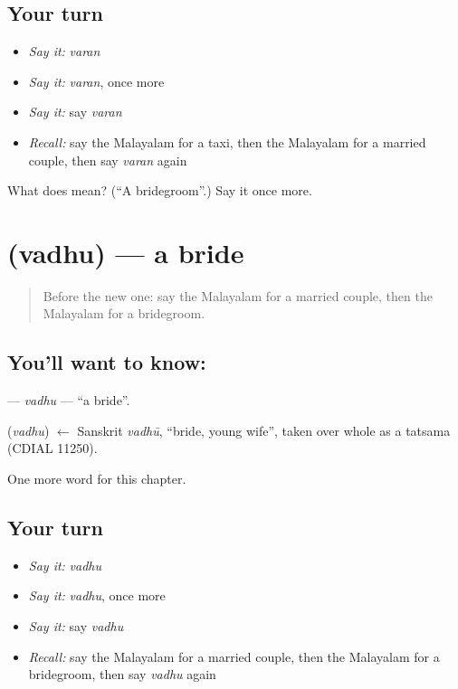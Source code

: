 \subsection*{Your turn}
\begin{itemize}
\raggedright
  \item \emph{Say it:} \emph{varan}
  \item \emph{Say it:} \emph{varan}, once more
  \item \emph{Say it:} say \emph{varan}
  \item \emph{Recall:} say the Malayalam for a taxi, then the Malayalam for a married couple, then say \emph{varan} again
\end{itemize}

\begin{tcolorbox}[breakable,colback=teal!4,colframe=teal!35!black,title={Before you move on}]
What does  mean? (\textquotedblleft{}A bridegroom\textquotedblright{}.) Say it once more.
\end{tcolorbox}
\section[\texorpdfstring{\ml{വധു} (vadhu)}{വധു (vadhu)}]{ (vadhu) — a bride}

\label{lesson:ML-C211-vadhu}



\begin{quote}
Before the new one: say the Malayalam for a married couple, then the Malayalam for a bridegroom.
\end{quote}

\subsection*{You'll want to know: }
\textbf{} — \emph{vadhu} — \textquotedblleft{}a bride\textquotedblright{}.

\begin{cousinweb}
\textbf{} (\emph{vadhu}) $\leftarrow$ Sanskrit \emph{vadhū}, \textquotedblleft{}bride, young wife\textquotedblright{}, taken over whole as a tatsama (CDIAL 11250).
\end{cousinweb}

\begin{grammarlens}[title={What you've built}]
One more word for this chapter.
\end{grammarlens}

\subsection*{Your turn}
\begin{itemize}
\raggedright
  \item \emph{Say it:} \emph{vadhu}
  \item \emph{Say it:} \emph{vadhu}, once more
  \item \emph{Say it:} say \emph{vadhu}
  \item \emph{Recall:} say the Malayalam for a married couple, then the Malayalam for a bridegroom, then say \emph{vadhu} again
\end{itemize}

